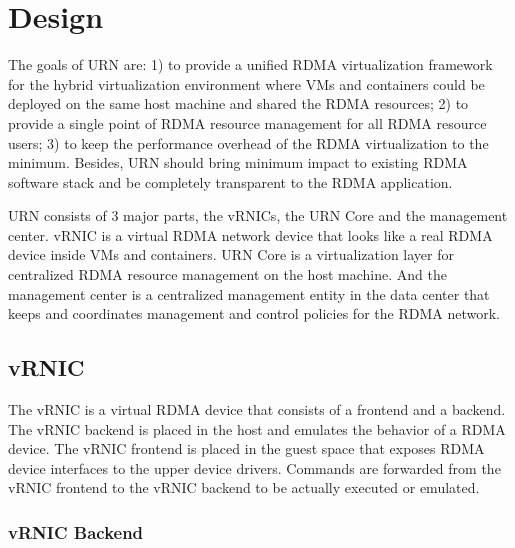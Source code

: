\section{Design}

The goals of URN are: 1) to provide a unified RDMA virtualization framework for the hybrid virtualization environment where VMs and containers could be deployed on the same host machine and shared the RDMA resources; 2) to provide a single point of RDMA resource management for all RDMA resource users; 3) to keep the performance overhead of the RDMA virtualization to the minimum. Besides, URN should bring minimum impact to existing RDMA software stack and be completely transparent to the RDMA application. 

URN consists of 3 major parts, the vRNICs, the URN Core and the management center. vRNIC is a virtual RDMA network device that looks like a real RDMA device inside VMs and containers. URN Core is a virtualization layer for centralized RDMA resource management on the host machine. And the management center is a centralized management entity in the data center that keeps and coordinates management and control policies for the RDMA network.

\subsection{vRNIC}

The vRNIC is a virtual RDMA device that consists of a frontend and a backend. The vRNIC backend is placed in the host and emulates the behavior of a RDMA device. The vRNIC frontend is placed in the guest space that exposes RDMA device interfaces to the upper device drivers. Commands are forwarded from the vRNIC frontend to the vRNIC backend to be actually executed or emulated.

\subsubsection{vRNIC Backend}

